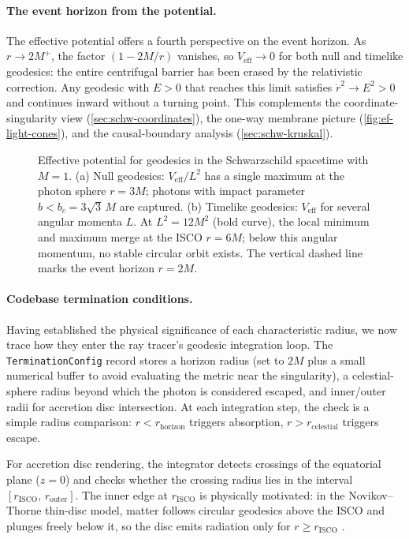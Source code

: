 \paragraph{The event horizon from the potential.}

The effective potential offers a fourth perspective on the event
horizon.  As $r \to 2M^+$, the factor $(1 - 2M/r)$ vanishes, so
$V_{\text{eff}} \to 0$ for both null and timelike geodesics: the
entire centrifugal barrier has been erased by the relativistic
correction.  Any geodesic with $E > 0$ that reaches this limit
satisfies $\dot{r}^2 \to E^2 > 0$ and continues inward without a
turning point.  This complements the coordinate-singularity view
(\cref{sec:schw-coordinates}), the one-way membrane picture
(\cref{fig:ef-light-cones}), and the causal-boundary analysis
(\cref{sec:schw-kruskal}).

\begin{figure}[t]
\centering

\caption[Effective potential for Schwarzschild geodesics]{Effective
  potential for geodesics in the Schwarzschild spacetime with $M = 1$.
  (a) Null geodesics: $V_{\text{eff}}/L^2$ has a single maximum at
  the photon sphere $r = 3M$; photons with impact parameter
  $b < b_c = 3\sqrt{3}\,M$ are captured.  (b) Timelike geodesics:
  $V_{\text{eff}}$ for several angular momenta $L$.  At
  $L^2 = 12M^2$ (bold curve), the local minimum and maximum merge at
  the ISCO $r = 6M$; below this angular momentum, no stable circular
  orbit exists.  The vertical dashed line marks the event horizon
  $r = 2M$.}
\label{fig:schw-effective-potential}
\end{figure}

\paragraph{Codebase termination conditions.}

Having established the physical significance of each characteristic
radius, we now trace how they enter the ray tracer's geodesic
integration loop.  The \texttt{TerminationConfig}
record stores a horizon radius (set to $2M$ plus a small numerical
buffer to avoid evaluating the metric near the singularity), a
celestial-sphere radius beyond which the photon is considered escaped,
and inner/outer radii for accretion disc intersection.
At each integration step, the check is a simple radius comparison:
$r < r_{\text{horizon}}$ triggers absorption,
$r > r_{\text{celestial}}$ triggers escape.

For accretion disc rendering, the integrator detects crossings of the
equatorial plane ($z = 0$) and checks whether the crossing radius lies
in the interval $[r_{\text{ISCO}},\, r_{\text{outer}}]$.  The inner
edge at $r_{\text{ISCO}}$ is physically motivated: in the
Novikov--Thorne thin-disc model, matter follows circular geodesics
above the ISCO and plunges freely below it, so the disc emits
radiation only for $r \geq r_{\text{ISCO}}$
\cite{Novikov1973,Page1974}.
